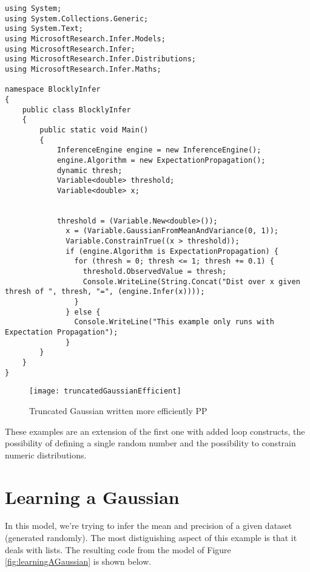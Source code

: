 \begin{lstlisting}
using System;
using System.Collections.Generic;
using System.Text;
using MicrosoftResearch.Infer.Models;
using MicrosoftResearch.Infer;
using MicrosoftResearch.Infer.Distributions;
using MicrosoftResearch.Infer.Maths;

namespace BlocklyInfer
{
	public class BlocklyInfer
	{
		public static void Main()
		{
			InferenceEngine engine = new InferenceEngine();
			engine.Algorithm = new ExpectationPropagation();
			dynamic thresh;
			Variable<double> threshold;
			Variable<double> x;


			threshold = (Variable.New<double>());
			  x = (Variable.GaussianFromMeanAndVariance(0, 1));
			  Variable.ConstrainTrue((x > threshold));
			  if (engine.Algorithm is ExpectationPropagation) {
			    for (thresh = 0; thresh <= 1; thresh += 0.1) {
			      threshold.ObservedValue = thresh;
			      Console.WriteLine(String.Concat("Dist over x given thresh of ", thresh, "=", (engine.Infer(x))));
			    }
			  } else {
			    Console.WriteLine("This example only runs with Expectation Propagation");
			  }
		}
	}
}
\end{lstlisting}

\begin{figure}[t]
  \begin{center}
    \leavevmode
    \texttt{[image: truncatedGaussianEfficient]}
    \caption{Truncated Gaussian written more efficiently PP}
    \label{fig:truncatedGaussianEfficient}
  \end{center}
\end{figure}

These examples are an extension of the first one with added loop constructs,
the possibility of defining a single random number and the possibility to constrain
numeric distributions.

\section{Learning a Gaussian}

In this model, we're trying to infer the mean and precision of a given dataset
(generated randomly). The most distiguishing aspect of this example is that it
deals with lists. The resulting code from the model of Figure \ref{fig:learningAGaussian}
is shown below.

